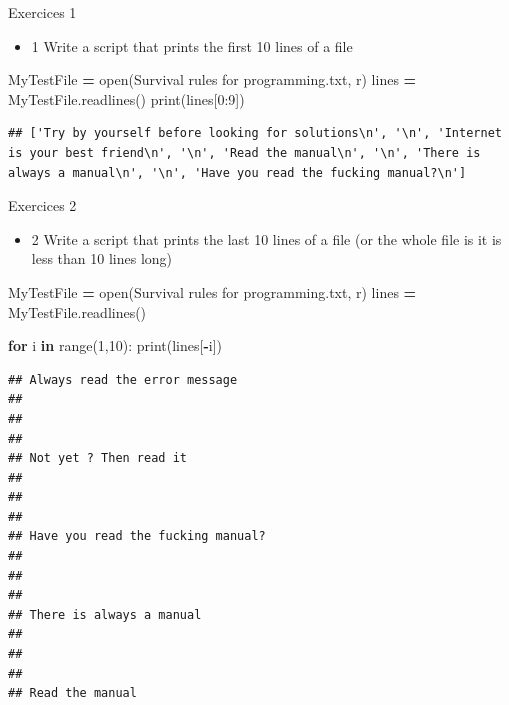 \documentclass[
  8pt,
  ignorenonframetext,
]{beamer}
\newenvironment{Shaded}{\begin{snugshade}}{\end{snugshade}}
\newcommand{\BuiltInTok}[1]{#1}
\newcommand{\ControlFlowTok}[1]{\textcolor[rgb]{0.13,0.29,0.53}{\textbf{#1}}}
\newcommand{\DecValTok}[1]{\textcolor[rgb]{0.00,0.00,0.81}{#1}}
\newcommand{\KeywordTok}[1]{\textcolor[rgb]{0.13,0.29,0.53}{\textbf{#1}}}
\newcommand{\NormalTok}[1]{#1}
\newcommand{\OperatorTok}[1]{\textcolor[rgb]{0.81,0.36,0.00}{\textbf{#1}}}
\newcommand{\StringTok}[1]{\textcolor[rgb]{0.31,0.60,0.02}{#1}}
\providecommand{\tightlist}{%
  \setlength{\itemsep}{0pt}\setlength{\parskip}{0pt}}
\begin{document}
\begin{frame}[fragile]{Exercices 1}
\protect\hypertarget{exercices-1-1}{}
\begin{itemize}
\tightlist
\item
  1 Write a script that prints the first 10 lines of a file
\end{itemize}

\begin{Shaded}
\begin{Highlighting}[]
\NormalTok{MyTestFile }\OperatorTok{=} \BuiltInTok{open}\NormalTok{(}\StringTok{\textquotesingle{}Survival rules for programming.txt\textquotesingle{}}\NormalTok{, }\StringTok{\textquotesingle{}r\textquotesingle{}}\NormalTok{)}
\NormalTok{lines }\OperatorTok{=}\NormalTok{ MyTestFile.readlines()}
\BuiltInTok{print}\NormalTok{(lines[}\DecValTok{0}\NormalTok{:}\DecValTok{9}\NormalTok{])}
\end{Highlighting}
\end{Shaded}

\begin{verbatim}
## ['Try by yourself before looking for solutions\n', '\n', 'Internet is your best friend\n', '\n', 'Read the manual\n', '\n', 'There is always a manual\n', '\n', 'Have you read the fucking manual?\n']
\end{verbatim}
\end{frame}

\begin{frame}[fragile]{Exercices 2}
\protect\hypertarget{exercices-2}{}
\begin{itemize}
\tightlist
\item
  2 Write a script that prints the last 10 lines of a file (or the whole
  file is it is less than 10 lines long)
\end{itemize}

\begin{Shaded}
\begin{Highlighting}[]
\NormalTok{MyTestFile }\OperatorTok{=} \BuiltInTok{open}\NormalTok{(}\StringTok{\textquotesingle{}Survival rules for programming.txt\textquotesingle{}}\NormalTok{, }\StringTok{\textquotesingle{}r\textquotesingle{}}\NormalTok{)}
\NormalTok{lines }\OperatorTok{=}\NormalTok{ MyTestFile.readlines()}

\ControlFlowTok{for}\NormalTok{ i }\KeywordTok{in} \BuiltInTok{range}\NormalTok{(}\DecValTok{1}\NormalTok{,}\DecValTok{10}\NormalTok{):}
  \BuiltInTok{print}\NormalTok{(lines[}\OperatorTok{{-}}\NormalTok{i])}
\end{Highlighting}
\end{Shaded}

\begin{verbatim}
## Always read the error message 
## 
## 
## 
## Not yet ? Then read it
## 
## 
## 
## Have you read the fucking manual?
## 
## 
## 
## There is always a manual
## 
## 
## 
## Read the manual
\end{verbatim}
\end{frame}
\end{document}

